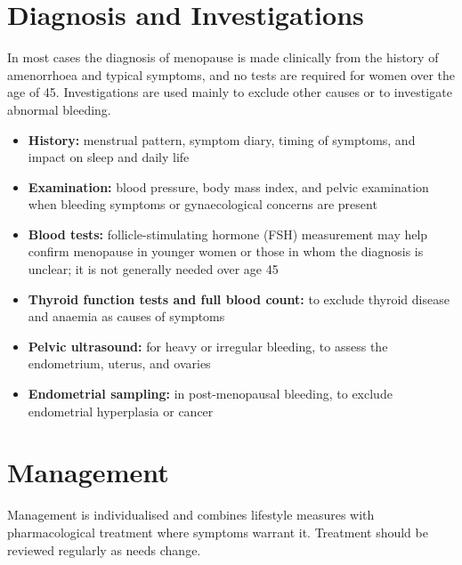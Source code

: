 \section*{Diagnosis and Investigations}
In most cases the diagnosis of menopause is made clinically from the history of amenorrhoea and typical symptoms, and no tests are required for women over the age of 45. Investigations are used mainly to exclude other causes or to investigate abnormal bleeding.

\begin{itemize}
    \item \textbf{History:} menstrual pattern, symptom diary, timing of symptoms, and impact on sleep and daily life
    \item \textbf{Examination:} blood pressure, body mass index, and pelvic examination when bleeding symptoms or gynaecological concerns are present
    \item \textbf{Blood tests:} follicle-stimulating hormone (FSH) measurement may help confirm menopause in younger women or those in whom the diagnosis is unclear; it is not generally needed over age 45
    \item \textbf{Thyroid function tests and full blood count:} to exclude thyroid disease and anaemia as causes of symptoms
    \item \textbf{Pelvic ultrasound:} for heavy or irregular bleeding, to assess the endometrium, uterus, and ovaries
    \item \textbf{Endometrial sampling:} in post-menopausal bleeding, to exclude endometrial hyperplasia or cancer
\end{itemize}

\section*{Management}
Management is individualised and combines lifestyle measures with pharmacological treatment where symptoms warrant it. Treatment should be reviewed regularly as needs change.

